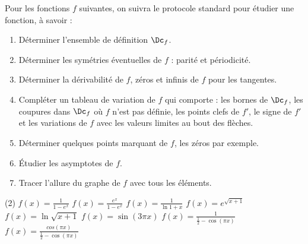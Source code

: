 %
%
Pour les fonctions $f$ suivantes, on suivra le protocole standard pour étudier une fonction, à savoir :
\begin{enumerate}
	\item Déterminer l'ensemble de définition $\Dc_f$.
	\item Déterminer les symétries éventuelles de $f$ : parité et périodicité.
	\item Déterminer la dérivabilité de $f$,  zéros et infinis de $f$ pour les tangentes.
	\item Compléter un tableau de variation de $f$ qui comporte : les bornes de $\Dc_f$, les coupures dans $\Dc_f$ où $f$ n'est pas définie, les points clefs de $f'$, le signe de $f'$ et les variations de $f$ avec les valeurs limites au bout des flèches.
	\item Déterminer quelques points marquant de $f$, les zéros par exemple.
	\item Étudier les asymptotes de $f$.
	\item Tracer l'allure du graphe de $f$ avec tous les éléments.
\end{enumerate}
	\begin{tasks}(2)
		\task $f(x)= \frac{1}{1-e^x}$
	    \task $f(x)= \frac{e^x}{1-e^x}$
		\task $f(x)= \frac{1}{\ln{1+x}}$
		\task $f(x)= e^{\sqrt{x+1}}$
	    \task $f(x)= \ln{\sqrt{x+1}}$
	    \task $f(x)= \sin(3 \pi x)$
	    \task $f(x)= \frac{1}{\frac{1}{2}-\cos(\pi x)}$
	    \task $f(x)= \frac{cos(\pi x)}{\frac{1}{2}-\cos(\pi x)}$
	\end{tasks}
